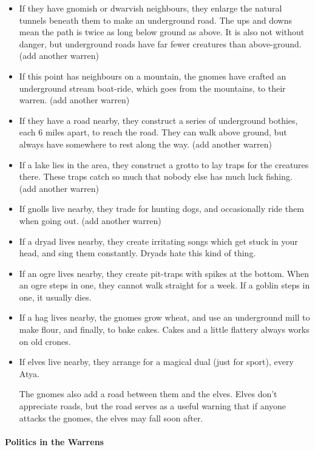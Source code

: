 \begin{multicols}{2}
\begin{itemize}
  \item
  If they have gnomish or dwarvish neighbours, they enlarge the natural tunnels beneath them to make an underground road.
  The ups and downs mean the path is twice as long below ground as above.
  It is also not without danger, but underground roads have far fewer creatures than above-ground.
  (add another warren)
  \item
  If this point has neighbours on a mountain, the gnomes have crafted an underground stream boat-ride, which goes from the mountains, to their warren.
  (add another warren)
  \item
  If they have a road nearby, they construct a series of underground bothies, each 6 miles apart, to reach the road.  They can walk above ground, but always have somewhere to rest along the way. (add another warren)
  \item
  If a lake lies in the area, they construct a grotto to lay traps for the creatures there.  These traps catch so much that nobody else has much luck fishing. (add another warren)
  \item
  If gnolls live nearby, they trade for hunting dogs, and occasionally ride them when going out. (add another warren)
  \item
  If a dryad lives nearby, they create irritating songs which get stuck in your head, and sing them constantly.  Dryads hate this kind of thing.
  \item
  If an ogre lives nearby, they create pit-traps with spikes at the bottom.  When an ogre steps in one, they cannot walk straight for a week.  If a goblin steps in one, it usually dies.
  \item
  If a hag lives nearby, the gnomes grow wheat, and use an underground mill to make flour, and finally, to bake cakes.  Cakes and a little flattery always works on old crones.
  \item
  If elves live nearby, they arrange for a magical dual (just for sport), every \gls{Atya}.

  The gnomes also add a road between them and the elves.
  Elves don't appreciate roads, but the road serves as a useful warning that if anyone attacks the gnomes, the elves may fall soon after.
\end{itemize}

\paragraph{Politics in the Warrens}


\end{multicols}
